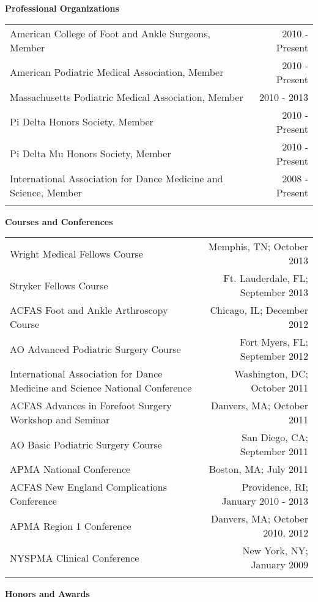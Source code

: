 \documentclass[letterpaper,10pt]{article}
\newcommand{\len}{7in}
\newcommand{\resheading}[1]{{\large \colorbox{mygrey}{
    \begin{minipage}{6.9in}{\textbf{#1}}
    \end{minipage}}}}
\begin{document}
\resheading{Professional Organizations}
\begin{tabular*}{\len}{@{\extracolsep{\fill}}lr}
    \\
    American College of Foot and Ankle Surgeons, Member & 2010 - Present \\
    American Podiatric Medical Association, Member & 2010 - Present \\
    Massachusetts Podiatric Medical Association, Member & 2010 - 2013 \\
    Pi Delta Honors Society, Member & 2010 - Present \\
    Pi Delta Mu Honors Society, Member & 2010 - Present \\
    International Association for Dance Medicine and Science, Member & 2008 - Present \\
    \\
\end{tabular*}
\resheading{Courses and Conferences}
\begin{tabular*}{\len}{@{\extracolsep{\fill}}lr}
    \\
    Wright Medical Fellows Course & Memphis, TN; October 2013 \\
    Stryker Fellows Course & Ft. Lauderdale, FL;  September 2013 \\
    ACFAS Foot and Ankle Arthroscopy Course & Chicago, IL; December 2012 \\
    AO Advanced Podiatric Surgery Course & Fort Myers, FL; September 2012 \\
    International Association for Dance Medicine and Science National Conference & Washington, DC; October 2011 \\
    ACFAS Advances in Forefoot Surgery Workshop and Seminar & Danvers, MA; October 2011 \\
    AO Basic Podiatric Surgery Course & San Diego, CA; September 2011 \\
    APMA National Conference & Boston, MA; July 2011 \\
    ACFAS New England Complications Conference & Providence, RI; January 2010 - 2013 \\
    APMA Region 1 Conference & Danvers, MA; October 2010, 2012 \\
    NYSPMA Clinical Conference & New York, NY; January 2009 \\
    \\
\end{tabular*}
\newpage
\resheading{Honors and Awards}
\end{document}
